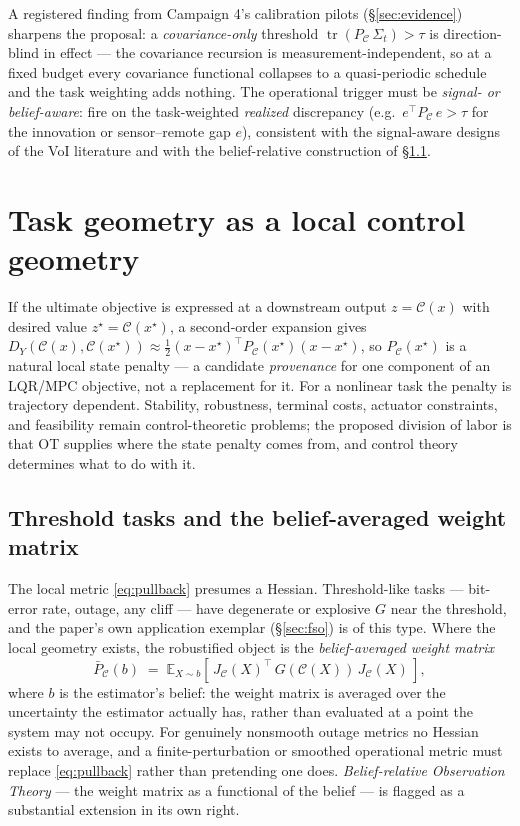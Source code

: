 \documentclass[letterpaper,onecolumn]{IEEEtran}
\theoremstyle{definition}
\theoremstyle{remark}
\newcommand{\E}{\mathbb{E}}
\newcommand{\PC}{P_{\mathcal{C}}}
\newcommand{\PCb}{\bar P_{\mathcal{C}}}
\newcommand{\tr}{\operatorname{tr}}
\newcommand{\C}{\mathcal{C}}
\newcommand{\Sig}{\Sigma}
\begin{document}
A registered finding from Campaign 4's calibration pilots
(\S\ref{sec:evidence}) sharpens the proposal: a \emph{covariance-only}
threshold $\tr(\PC\,\Sig_t)>\tau$ is direction-blind in effect --- the
covariance recursion is measurement-independent, so at a fixed budget every
covariance functional collapses to a quasi-periodic schedule and the
task weighting adds nothing. The operational trigger must be
\emph{signal- or belief-aware}: fire on the task-weighted \emph{realized}
discrepancy (e.g.\ $e^{\top}\PC\,e>\tau$ for the innovation or
sensor--remote gap $e$), consistent with the signal-aware designs of the VoI
literature and with the belief-relative construction of \S\ref{sec:belief}.

\section{Task geometry as a local control geometry}
\label{sec:control}

If the ultimate objective is expressed at a downstream output $z=\C(x)$ with
desired value $z^{\star}=\C(x^{\star})$, a second-order expansion gives
$D_Y(\C(x),\C(x^{\star}))\approx\tfrac12 (x-x^{\star})^{\top}
\PC(x^{\star})(x-x^{\star})$, so $\PC(x^{\star})$ is a natural local state
penalty --- a candidate \emph{provenance} for one component of an LQR/MPC
objective, not a replacement for it. For a nonlinear task the penalty is
trajectory dependent. Stability, robustness, terminal costs, actuator
constraints, and feasibility remain control-theoretic problems; the proposed
division of labor is that OT supplies where the state penalty comes from, and
control theory determines what to do with it.

\subsection{Threshold tasks and the belief-averaged weight matrix}
\label{sec:belief}

The local metric \eqref{eq:pullback} presumes a Hessian. Threshold-like
tasks --- bit-error rate, outage, any cliff --- have degenerate or
explosive $G$ near the threshold, and the paper's own application exemplar
(\S\ref{sec:fso}) is of this type. Where the local geometry exists, the
robustified object is the \emph{belief-averaged weight matrix}
\begin{equation}
\label{eq:beliefavg}
\PCb(b)\;=\;\E_{X\sim b}\!\left[\,J_\C(X)^{\top}\,G(\C(X))\,J_\C(X)\,\right],
\end{equation}
where $b$ is the estimator's belief: the weight matrix is averaged over the
uncertainty the estimator actually has, rather than evaluated at a point the
system may not occupy. For genuinely nonsmooth outage metrics no Hessian
exists to average, and a finite-perturbation or smoothed operational metric
must replace \eqref{eq:pullback} rather than pretending one does.
\emph{Belief-relative Observation Theory} --- the weight matrix as a
functional of the belief --- is flagged as a substantial extension in its own
right.
\end{document}
